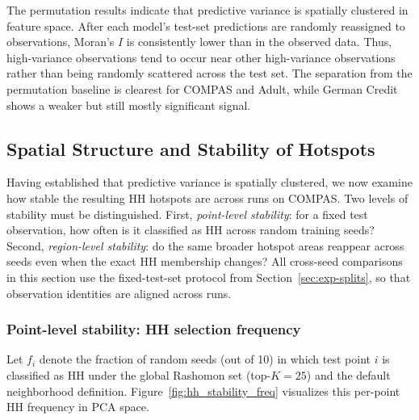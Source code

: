\begin{table}[htbp]
\centering
\caption{Prediction-matrix permutation null summary by dataset. A run is counted as significant
when the empirical permutation $p$-value for Moran's $I$ is below $0.05$. The null uses
$R=100$ prediction-matrix permutations per run, so the smallest attainable empirical
$p$-value is $1/101 \approx 0.0099$. Values are computed over 10 runs.}
\label{tab:null_significance}

\end{table}

The permutation results indicate that predictive variance is spatially clustered in
feature space. After each model's test-set predictions are randomly reassigned to
observations, Moran's $I$ is consistently lower than in the observed data. Thus,
high-variance observations tend to occur near other high-variance observations
rather than being randomly scattered across the test set. The separation from the permutation
baseline is clearest for COMPAS and Adult, while German Credit shows a weaker but
still mostly significant signal.

\subsection{Spatial Structure and Stability of Hotspots}
\label{sec:results-spatial}

Having established that predictive variance is spatially clustered, we now examine how
stable the resulting HH hotspots are across runs on COMPAS. Two levels of stability must
be distinguished. First, \emph{point-level stability}: for a fixed test observation, how
often is it classified as HH across random training seeds? Second, \emph{region-level stability}:
do the same broader hotspot areas reappear across seeds even when the exact HH membership changes?
All cross-seed comparisons in this section use the fixed-test-set protocol from 
Section~\ref{sec:exp-splits}, so that observation identities are aligned across runs.


\subsubsection{Point-level stability: HH selection frequency}

Let $f_i$ denote the fraction of random seeds (out of 10) in which test point $i$ is classified
as HH under the global Rashomon set (top-$K=25$) and the default neighborhood definition. 
Figure~\ref{fig:hh_stability_freq} visualizes this per-point HH frequency in PCA space.

